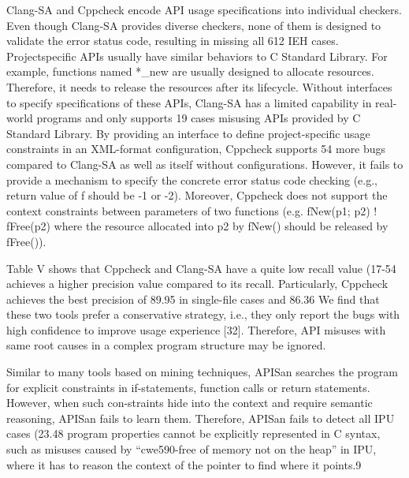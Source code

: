 Clang-SA and Cppcheck encode API usage specifications
into individual checkers. Even though Clang-SA provides
diverse checkers, none of them is designed to validate the error
status code, resulting in missing all 612 IEH cases. Projectspecific
APIs usually have similar behaviors to C Standard
Library. For example, functions named *\_new are usually
designed to allocate resources. Therefore, it needs to release
the resources after its lifecycle. Without interfaces to specify
specifications of these APIs, Clang-SA has a limited capability
in real-world programs and only supports 19%
cases misusing APIs provided by C Standard Library. By providing
an interface to define project-specific usage constraints
in an XML-format configuration, Cppcheck supports 54%
more bugs compared to Clang-SA as well as itself without
configurations. However, it fails to provide a mechanism to
specify the concrete error status code checking (e.g., return
value of f should be -1 or -2). Moreover, Cppcheck does
not support the context constraints between parameters of
two functions (e.g. fNew(p1; p2) ! fFree(p2) where the
resource allocated into p2 by fNew() should be released by
fFree()).

Table V shows that Cppcheck and Clang-SA have a quite
low recall value (17-54%
achieves a higher precision value compared to its recall.
Particularly, Cppcheck achieves the best precision of 89.95%
in single-file cases and 86.36%
We find that these two tools prefer a conservative strategy,
i.e., they only report the bugs with high confidence to improve
usage experience [32]. Therefore, API misuses with same root
causes in a complex program structure may be ignored.

Similar to many tools based on mining techniques, APISan
searches the program for explicit constraints in if-statements,
function calls or return statements. However, when such con-straints hide into the context and require semantic reasoning,
APISan fails to learn them. Therefore, APISan fails to detect
all IPU cases (23.48%
program properties cannot be explicitly represented in C
syntax, such as misuses caused by “cwe590-free of memory
not on the heap” in IPU, where it has to reason the context of
the pointer to find where it points.9

